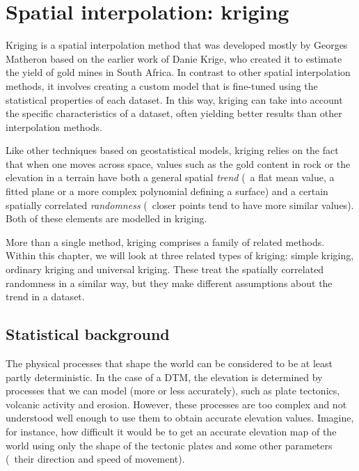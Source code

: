 
\setchapterpreamble[u]{\margintoc}


\graphicspath{{kriging/}}

\chapter{Spatial interpolation: kriging}%
\label{chap:kriging}

Kriging is a spatial interpolation method that was developed mostly by Georges Matheron based on the earlier work of Danie Krige, who created it to estimate the yield of gold mines in South Africa.
In contrast to other spatial interpolation methods, it involves creating a custom model that is fine-tuned using the statistical properties of each dataset.
In this way, kriging can take into account the specific characteristics of a dataset, often yielding better results than other interpolation methods.

Like other techniques based on geostatistical models, kriging relies on the fact that when one moves across space, values such as the gold content in rock or the elevation in a terrain have both a general spatial \emph{trend} (\eg\ a flat mean value, a fitted plane or a more complex polynomial defining a surface) and a certain spatially correlated \emph{randomness} (\ie\ closer points tend to have more similar values).
Both of these elements are modelled in kriging.

More than a single method, kriging comprises a family of related methods.
Within this chapter, we will look at three related types of kriging: simple kriging, ordinary kriging and universal kriging.
These treat the spatially correlated randomness in a similar way, but they make different assumptions about the trend in a dataset.

\section{Statistical background}

The physical processes that shape the world can be considered to be at least partly deterministic.
In the case of a DTM, the elevation is determined by processes that we can model (more or less accurately), such as plate tectonics, volcanic activity and erosion.
However, these processes are too complex and not understood well enough to use them to obtain accurate elevation values.
Imagine, for instance, how difficult it would be to get an accurate elevation map of the world using only the shape of the tectonic plates and some other parameters (\eg\ their direction and speed of movement).

